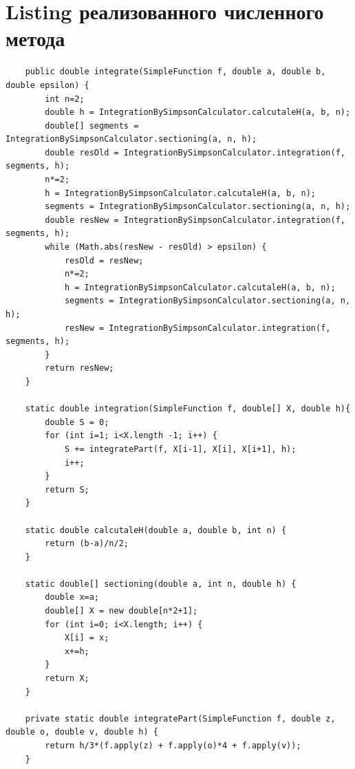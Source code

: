 \section{Listing реализованного численного метода}
\tiny
\begin{verbatim}
    public double integrate(SimpleFunction f, double a, double b, double epsilon) {
        int n=2;
        double h = IntegrationBySimpsonCalculator.calcutaleH(a, b, n);
        double[] segments = IntegrationBySimpsonCalculator.sectioning(a, n, h);
        double resOld = IntegrationBySimpsonCalculator.integration(f, segments, h);
        n*=2;
        h = IntegrationBySimpsonCalculator.calcutaleH(a, b, n);
        segments = IntegrationBySimpsonCalculator.sectioning(a, n, h);
        double resNew = IntegrationBySimpsonCalculator.integration(f, segments, h);
        while (Math.abs(resNew - resOld) > epsilon) {
            resOld = resNew;
            n*=2;
            h = IntegrationBySimpsonCalculator.calcutaleH(a, b, n);
            segments = IntegrationBySimpsonCalculator.sectioning(a, n, h);
            resNew = IntegrationBySimpsonCalculator.integration(f, segments, h);
        }
        return resNew;
    }

    static double integration(SimpleFunction f, double[] X, double h){
        double S = 0;
        for (int i=1; i<X.length -1; i++) {
            S += integratePart(f, X[i-1], X[i], X[i+1], h);
            i++;
        }
        return S;
    }

    static double calcutaleH(double a, double b, int n) {
        return (b-a)/n/2;
    }

    static double[] sectioning(double a, int n, double h) {
        double x=a;
        double[] X = new double[n*2+1];
        for (int i=0; i<X.length; i++) {
            X[i] = x;
            x+=h;
        }
        return X;
    }

    private static double integratePart(SimpleFunction f, double z, double o, double v, double h) {
        return h/3*(f.apply(z) + f.apply(o)*4 + f.apply(v));
    }

\end{verbatim}
\normalsize

